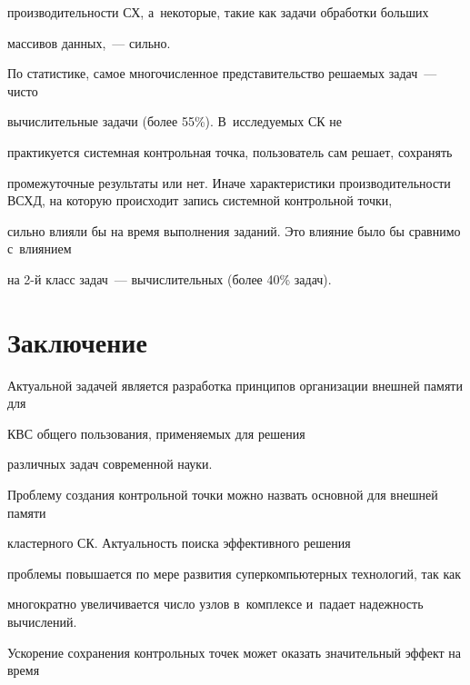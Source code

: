 производительности СХ, а~некоторые, такие как задачи обработки больших


массивов данных,~--- сильно.





      По статистике, самое многочисленное представительство решаемых задач~--- чисто


вычислительные задачи (более 55\%). В~исследуемых СК не


практикуется системная контрольная точка, пользователь сам решает, сохранять


промежуточные результаты или нет. Иначе характеристики производительности ВСХД, на которую происходит запись системной контрольной точки,


сильно влияли бы на время выполнения заданий. Это влияние было бы сравнимо с~влиянием


на 2-й класс задач~--- вычислительных (более 40\% задач).











\section{Заключение}





\vspace*{-2pt}





      Актуальной задачей является разработка принципов организации внешней памяти для


КВС общего пользования, при\-ме\-ня\-емых для решения


различных задач современной науки.





      Проблему создания контрольной точки можно назвать основной для внешней памяти


кластерного СК. Актуальность поиска эффективного решения


проблемы повышается по мере развития суперкомпьютерных технологий, так как


многократно увеличивается чис\-ло узлов в~комплексе и~падает надежность вы\-чис\-ле\-ний.


Ускорение сохранения контрольных точек может оказать значительный эффект на время


